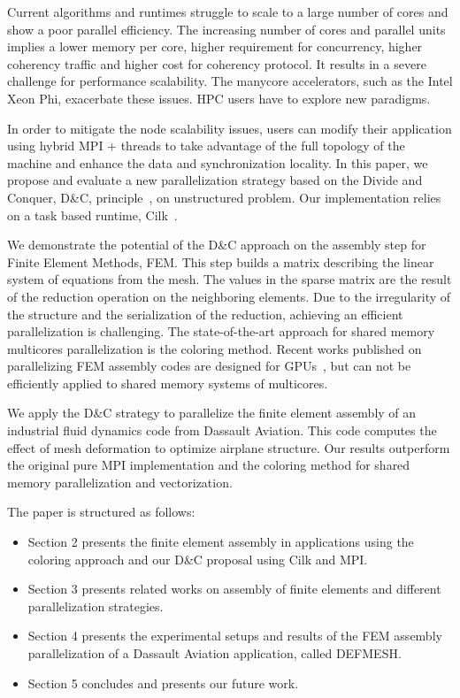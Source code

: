 \documentclass[10pt]{IOS-Book-Article}
\begin{document}
Current algorithms and runtimes struggle to scale to a large number of cores and show a poor parallel efficiency. 
The increasing number of cores and parallel units implies a lower memory per core, higher requirement for concurrency, higher coherency traffic and higher cost for coherency protocol.
It results in a severe challenge for performance scalability. The manycore accelerators, such as the Intel Xeon Phi, exacerbate these issues.
HPC users have to explore new paradigms.

In order to mitigate the node scalability issues, users can modify their application using hybrid MPI + threads to take advantage of the full topology of the machine and enhance the data and synchronization locality.
In this paper, we propose and evaluate a new parallelization strategy based on the Divide and Conquer, D\&C, principle~\cite{dc_specfem}, on unstructured problem.
Our implementation relies on a task based runtime, Cilk~\cite{cilk5}. 

We demonstrate the potential of the D\&C approach on the assembly step for Finite Element Methods, FEM.
This step builds a matrix describing the linear system of equations from the mesh.
The values in the sparse matrix are the result of the reduction operation on the neighboring elements.
Due to the irregularity of the structure and the serialization of the reduction, achieving an efficient parallelization is challenging. 
The state-of-the-art approach for shared memory multicores parallelization is the coloring method.
Recent works published on parallelizing FEM assembly codes are designed for GPUs~\cite{cecka2011assembly,CPUGPUasm}, but can not be efficiently applied to shared memory systems of multicores.

We apply the D\&C strategy to parallelize the finite element assembly of an industrial fluid dynamics code from Dassault Aviation.
This code computes the effect of mesh deformation to optimize airplane structure.
Our results outperform the original pure MPI implementation and the coloring method for shared memory parallelization and vectorization.

The paper is structured as follows:
\begin{itemize}
\item Section 2 presents the finite element assembly in applications using the coloring approach and our D\&C proposal using Cilk and MPI.
\item Section 3 presents related works on assembly of finite elements and different parallelization strategies.
\item Section 4 presents the experimental setups and results of the FEM assembly parallelization of a Dassault Aviation application, called DEFMESH.
\item Section 5 concludes and presents our future work.
\end{itemize}
\end{document}
